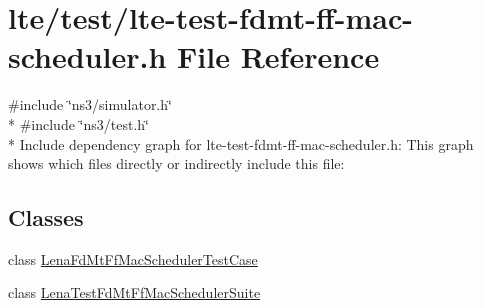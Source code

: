 \hypertarget{lte-test-fdmt-ff-mac-scheduler_8h}{}\section{lte/test/lte-\/test-\/fdmt-\/ff-\/mac-\/scheduler.h File Reference}
\label{lte-test-fdmt-ff-mac-scheduler_8h}
{\ttfamily \#include \char`\"{}ns3/simulator.\+h\char`\"{}}\\*
{\ttfamily \#include \char`\"{}ns3/test.\+h\char`\"{}}\\*
Include dependency graph for lte-\/test-\/fdmt-\/ff-\/mac-\/scheduler.h\+:
This graph shows which files directly or indirectly include this file\+:
\subsection*{Classes}
\begin{DoxyCompactItemize}
\item 
class \hyperlink{classLenaFdMtFfMacSchedulerTestCase}{Lena\+Fd\+Mt\+Ff\+Mac\+Scheduler\+Test\+Case}
\item 
class \hyperlink{classLenaTestFdMtFfMacSchedulerSuite}{Lena\+Test\+Fd\+Mt\+Ff\+Mac\+Scheduler\+Suite}
\end{DoxyCompactItemize}

